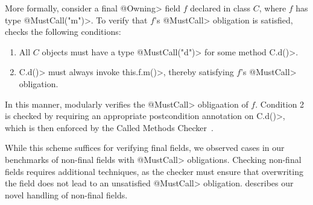   More formally, consider a final \<@Owning> field $f$ declared in class $C$,
  where
  $f$ has type \<@MustCall("m")>.  To
  verify that $f$'s \<@MustCall> obligation is satisfied, \Tool checks the following
  conditions:
  \begin{enumerate}
    \item All $C$ objects must have a type \<@MustCall("d")> for some method \<C.d()>.
    \item \<C.d()> must always invoke \<this.f.m()>, thereby satisfying $f$'s
    \<@MustCall> obligation.
  \end{enumerate}
  In this manner, \Tool modularly verifies the \<@MustCall> obligaation of $f$.  Condition 2 is
  checked by requiring an appropriate \EnsuresCalledMethods
  postcondition annotation on
  \<C.d()>, which is then enforced by the Called Methods
  Checker~\cite{KelloggRSSE2020}.   

  While this scheme suffices for verifying final fields, we observed cases
  in our benchmarks of non-final fields with \<@MustCall> obligations.  Checking
  non-final fields requires additional techniques, as the checker must ensure
  that overwriting the field does not lead to an unsatisfied \<@MustCall> obligation.
   describes our novel handling of non-final fields.


